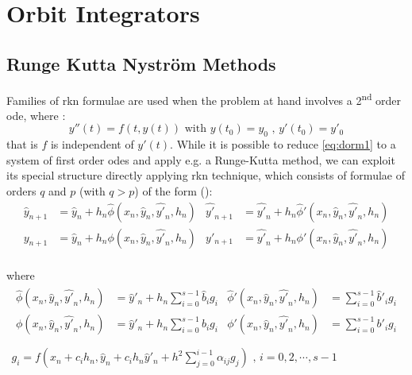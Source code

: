 \chapter{Orbit Integrators}
\label{ch:orbit-integrators}

\section{Runge Kutta Nystr{\"o}m Methods}
Families of \gls{rkn} formulae are used when the problem at hand involves 
a 2\textsuperscript{nd} order \gls{ode}, where :
\begin{equation}
  \label{eq:dorm1}
  y''(t) = f(t, y(t)) \text{ with } y(t_0) = y_0 \text{ , } y'(t_0) = y'_0
\end{equation}
that is \( f \) is independent of \( y'(t) \). While it is possible to reduce 
\ref{eq:dorm1} to a system of first order \glspl{ode} and apply e.g. a Runge-Kutta 
method, we can exploit its special structure directly applying \gls{rkn} technique,
which consists of formulae of orders \(q\) and \(p\) (with \(q>p\)) of the form 
(\cite{dormand87}):
\begin{equation}
  \begin{aligned}
    \hat{y}_{n+1}  & = \hat{y}_n + h_n \hat{\phi}(x_n , \hat{y}_n , \hat{y'}_n , h_n) & 
    \hat{y'}_{n+1} & = \hat{y'}_n + h_n \hat{\phi}' (x_n , \hat{y}_n , \hat{y'}_n , h_n) \\
    y_{n+1}        & = \hat{y}_n + h_n \phi (x_n , \hat{y}_n , \hat{y'}_n , h_n) & 
    y'_{n+1}       & = \hat{y'}_n + h_n {\phi}' (x_n , \hat{y}_n , \hat{y'}_n , h_n) \\
  \end{aligned}
\end{equation}

where
\begin{equation}
  \begin{aligned}
    \begin{aligned}
    \hat{\phi}(x_n , \hat{y}_n , \hat{y'}_n , h_n) & = \hat{y}'_n + h_n \sum_{i=0}^{s-1} \hat{b}_i g_i & 
    \hat{\phi}'(x_n , \hat{y}_n , \hat{y'}_n , h_n) & = \sum_{i=0}^{s-1} \hat{b}'_i g_i \\
         \phi (x_n , \hat{y}_n , \hat{y'}_n , h_n) & = \hat{y}'_n + h_n \sum_{i=0}^{s-1} b_i g_i & 
         {\phi}' (x_n , \hat{y}_n , \hat{y'}_n , h_n) & = \sum_{i=0}^{s-1} b'_i g_i \\
    \end{aligned}
    \\
    g_i = f(x_n + c_i h_n , \hat{y}_n +c_i h_n \hat{y}'_n + h^2 \sum_{j=0}^{i-1} {\alpha}_{ij}g_j) \text{ ,  } i=0,2,\cdots ,s-1\\
  \end{aligned}
\end{equation}

